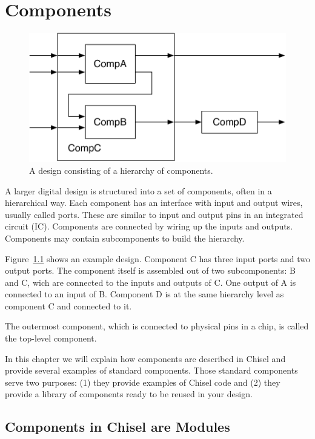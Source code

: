 \documentclass[%
    10pt,
    headinclude, footexclude,
    openright, %
    notitlepage,
    cleardoubleempty,
    headsepline,
    pointlessnumbers,
    bibtotoc, idxtotoc,
    ]{scrbook}
\newcommand{\scale}{0.7}
\begin{document}
\chapter{Components}

\begin{figure}
  \centering
  \includegraphics[scale=\scale]{figures/components}
  \caption{A design consisting of a hierarchy of components.}
  \label{fig:components}
\end{figure}


A larger digital design is structured into a set of components, often in
a hierarchical way. Each component has an interface with input and output
wires, usually called ports. These are similar to input and output pins in an integrated circuit (IC).
Components are connected by wiring up the inputs and outputs.
Components may contain subcomponents to build the hierarchy.

Figure~\ref{fig:components} shows an example design. Component C has
three input ports and two output ports. The component itself is assembled out
of two subcomponents: B and C, wich are connected to the inputs and
outputs of C. One output of A is connected to an input of B.
Component D is at the same hierarchy level as component C and connected
to it.

The outermost component, which is connected to physical pins
in a chip, is called the top-level component.

In this chapter we will explain how components are described in Chisel and
provide several examples of standard components.
Those standard components serve two purposes: (1) they provide examples
of Chisel code and (2) they provide a library of components ready to be reused
in your design.

\section{Components in Chisel are Modules}
\end{document}
